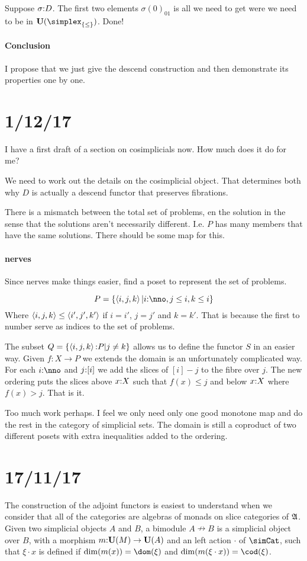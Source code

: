 \documentclass[csh.tex]{subfiles}
\begin{document}
Suppose $\sigma \mathord : D$. The first two elements $\sigma(0)_{01}$ is all we need to get were we need to be in $\base(\simplex_{\set\leq})$. Done!

\paragraph{Conclusion}
I propose that we just give the descend construction and then demonstrate its properties one by one.

\section{1/12/17}
I have a first draft of a section on cosimplicials now. How much does it do for me?

We need to work out the details on the cosimplicial object. That determines both why $D$ is actually a descend functor that preserves fibrations.

There is a mismatch between the total set of problems, en the solution in the sense that the solutions aren't necessarily different. I.e. $P$ has many members that have the same solutions. There should be some map for this.

\paragraph{nerves}
Since nerves make things easier, find a poset to represent the set of problems.

\[ P = \set{\tuplet{i,j,k}|i\of\nno,j\leq i, k\leq i}\]
Where $\left\langle i,j,k \right\rangle\leq \left\langle i',j',k' \right\rangle$ if $i=i'$, $j=j'$ and $k=k'$. That is because the first to number serve as indices to the set of problems.

The subset $Q = \left\{\left\langle i,j,k \right\rangle\mathord : P|j\neq k\right\}$ allows us to define the functor $S$ in an easier way. Given $f:X\to P$ we extends the domain is an unfortunately complicated way. For each $i\of\nno$ and $j\mathord :[i]$ we add the slices of $[i] - j$ to the fibre over $j$. The new ordering puts the slices above $x\mathord : X$ such that $f(x)\leq j$ and below $x\mathord : X$ where $f(x)>j$. That is it.

Too much work perhaps. I feel we only need only one good monotone map and do the rest in the category of simplicial sets. The domain is still a coproduct of two different posets with extra inequalities added to the ordering.


\section{17/11/17}
The construction of the adjoint functors is easiest to understand when we consider that all of the categories are algebras of monads on slice categories of $\mathfrak A$. Given two simplicial objects $A$ and $B$, a bimodule $A\nrightarrow B$ is a simplicial object over $B$, with a morphism $m\mathord :\mathbf{U}(M)\to \mathbf{U}(A)$ and an left action $\cdot$ of $\simCat$, such that $\xi\cdot x$ is defined if $\dim(m(x)) = \dom(\xi)$ and $\dim(m(\xi\cdot x)) = \cod(\xi)$.
\end{document}
